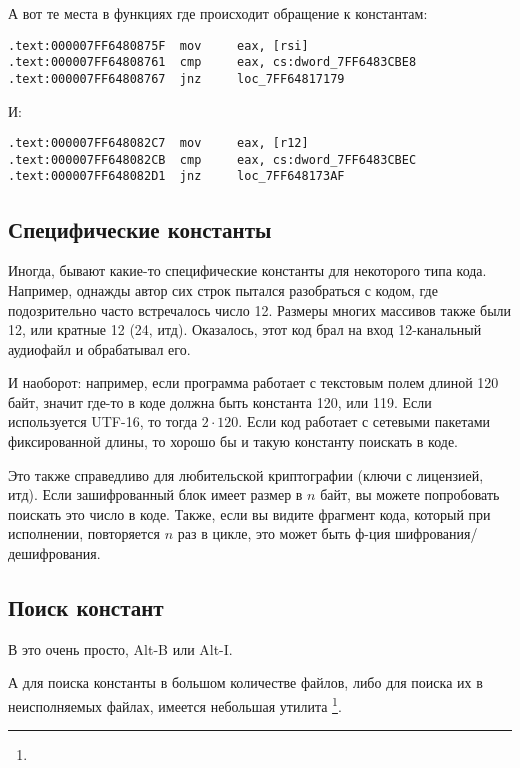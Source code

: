 А вот те места в функциях где происходит обращение к константам:

\begin{lstlisting}[caption=dhcpcore.dll (Windows 7 x64),style=customasmx86]
.text:000007FF6480875F  mov     eax, [rsi]
.text:000007FF64808761  cmp     eax, cs:dword_7FF6483CBE8
.text:000007FF64808767  jnz     loc_7FF64817179
\end{lstlisting}

И:

\begin{lstlisting}[caption=dhcpcore.dll (Windows 7 x64),style=customasmx86]
.text:000007FF648082C7  mov     eax, [r12]
.text:000007FF648082CB  cmp     eax, cs:dword_7FF6483CBEC
.text:000007FF648082D1  jnz     loc_7FF648173AF
\end{lstlisting}

\subsection{Специфические константы}

Иногда, бывают какие-то специфические константы для некоторого типа кода.
Например, однажды автор сих строк пытался разобраться с кодом, где подозрительно часто встречалось число 12.
Размеры многих массивов также были 12, или кратные 12 (24, итд).
Оказалось, этот код брал на вход 12-канальный аудиофайл и обрабатывал его.

И наоборот: например, если программа работает с текстовым полем длиной 120 байт, значит где-то в коде должна
быть константа 120, или 119.
Если используется UTF-16, то тогда $2 \cdot 120$.
Если код работает с сетевыми пакетами фиксированной длины, то хорошо бы и такую константу поискать в коде.

Это также справедливо для любительской криптографии (ключи с лицензией, итд).
Если зашифрованный блок имеет размер в $n$ байт, вы можете попробовать поискать это число в коде.
Также, если вы видите фрагмент кода, который при исполнении, повторяется $n$ раз в цикле,
это может быть ф-ция шифрования/дешифрования.

\subsection{Поиск констант}

В \IDA это очень просто, Alt-B или Alt-I.

А для поиска константы в большом количестве файлов, либо для поиска их в неисполняемых файлах, имеется небольшая утилита
\footnote{\BGREPURL}.

